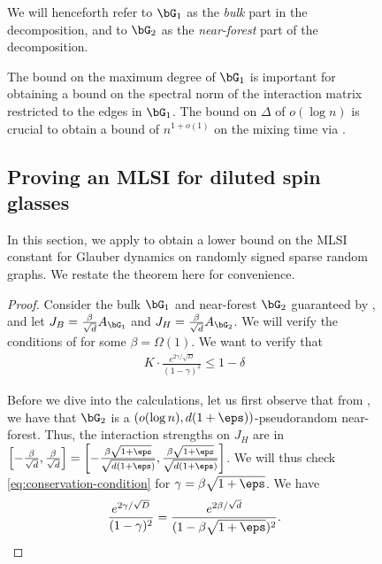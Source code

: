 \documentclass[11pt,letterpaper]{article}
\begin{document}
\begin{figure}
    \begin{remark}
        We will henceforth refer to $\bG_1$ as the \emph{bulk} part in the decomposition, and to $\bG_2$ as the \emph{near-forest} part of the decomposition.
    \end{remark}

    \begin{remark}
        The bound on the maximum degree of $\bG_1$ is important for obtaining a bound on the spectral norm of the interaction matrix restricted to the edges in $\bG_1$.
        The bound on $\Delta$ of $o(\log n)$ is crucial to obtain a bound of $n^{1+o(1)}$ on the mixing time via .
    \end{remark}

\subsection{Proving an MLSI for diluted spin glasses}
\label{sec:spinglass-mlsi}

    In this section, we apply  to obtain a lower bound on the MLSI constant for Glauber dynamics on randomly signed sparse random graphs. We restate the theorem here for convenience.

    \spinglassmixing*
    \begin{proof}
        Consider the bulk $\bG_1$ and near-forest $\bG_2$ guaranteed by , and let $J_B = \frac{\beta}{\sqrt{d}} A_{\bG_1}$ and $J_H = \frac{\beta}{\sqrt{d}} A_{\bG_2}$. 
        We will verify the conditions of  for some $\beta = \Omega(1)$. We want to verify that 
        \begin{align}
            K \cdot \frac{e^{2\gamma/\sqrt{D}}}{(1-\gamma)^2} \le 1-\delta 
            \label{eq:conservation-condition}
        \end{align}
        
        Before we dive into the calculations, let us first observe that from , we have that $\bG_2$ is a $(o(\log n),d(1+\eps))$-pseudorandom near-forest. 
        Thus, the interaction strengths on $J_H$ are in $\left[ -\frac{\beta}{\sqrt{d}} , \frac{\beta}{\sqrt{d}} \right] = \left[ - \frac{\beta\sqrt{1+\eps}}{\sqrt{d(1+\eps)}} , \frac{\beta\sqrt{1+\eps}}{\sqrt{d(1+\eps)}} \right]$.
        We will thus check \eqref{eq:conservation-condition} for $\gamma = \beta\sqrt{1+\eps}$. We have
        \[ \frac{e^{2\gamma/\sqrt{D}}}{(1-\gamma)^2} = \frac{e^{2\beta/\sqrt{d}}}{(1-\beta\sqrt{1+\eps})^2}. \]
    

\end{proof}
\end{figure}
\end{document}

